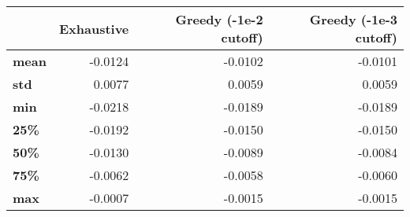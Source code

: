 \begin{tabular}{lrrr}
\toprule
{} &  Exhaustive &  Greedy (-1e-2 cutoff) &  Greedy (-1e-3 cutoff) \\
\midrule
\textbf{mean} &     -0.0124 &                -0.0102 &                -0.0101 \\
\textbf{std } &      0.0077 &                 0.0059 &                 0.0059 \\
\textbf{min } &     -0.0218 &                -0.0189 &                -0.0189 \\
\textbf{25\% } &     -0.0192 &                -0.0150 &                -0.0150 \\
\textbf{50\% } &     -0.0130 &                -0.0089 &                -0.0084 \\
\textbf{75\% } &     -0.0062 &                -0.0058 &                -0.0060 \\
\textbf{max } &     -0.0007 &                -0.0015 &                -0.0015 \\
\bottomrule
\end{tabular}
